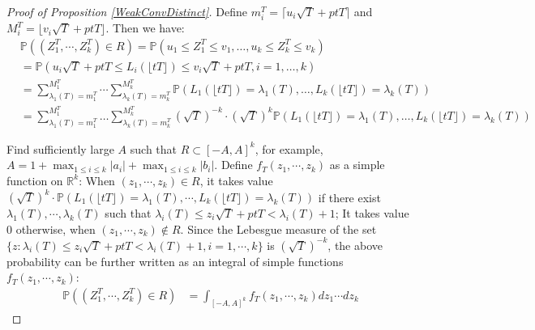 \begin{proof}[Proof of Proposition \ref{WeakConvDistinct}]
Define $m_{i}^{T}=\lceil u_{i}\sqrt{T}+ptT\rceil$ and $M_{i}^{T}=\lfloor v_{i}\sqrt{T}+ptT\rfloor$. Then we have:
\begin{align*}
&\mathbb{P}((Z_{1}^{T},\cdots,Z_{k}^{T})\in R)=\mathbb{P}(u_{1}\leqslant Z_{1}^{T} \leqslant v_{1}, \dots,  u_{k}\leqslant Z_{k}^{T} \leqslant v_{k})\\
&=\mathbb{P}(u_{i}\sqrt{T}+ptT\leqslant L_{i}(\lfloor tT\rfloor) \leqslant v_{i}\sqrt{T}+ptT, i=1,\dots, k)\\
&=\sum_{\lambda_{1}(T)=m_{1}^{T}}^{M_{1}^{T}}\cdots\sum_{\lambda_{k}(T)=m_{k}^{T}}^{M_{k}^{T}}\mathbb{P}(L_{1}(\lfloor tT \rfloor)=\lambda_{1}(T),\dots,L_{k}(\lfloor tT \rfloor)=\lambda_{k}(T))\\
&=\sum_{\lambda_{1}(T)=m_{1}^{T}}^{M_{1}^{T}}\dots\sum_{\lambda_{k}(T)=m_{k}^{T}}^{M_{k}^{T}}(\sqrt{T})^{-k}\cdot(\sqrt{T})^{k}\mathbb{P}(L_{1}(\lfloor tT \rfloor)=\lambda_{1}(T),\dots,L_{k}(\lfloor tT \rfloor)=\lambda_{k}(T))
\end{align*}

Find sufficiently large $A$ such that $R\subset[-A,A]^{k}$, for example, $A=1+\max_{1\leqslant i\leqslant k}|a_{i}|+\max_{1\leqslant i\leqslant k}|b_{i}|$. Define $f_{T}(z_{1},\cdots,z_{k})$ as a simple function on $\mathbb{R}^{k}$: When $(z_{1},\cdots,z_{k})\in R$, it takes value $(\sqrt{T})^{k}\cdot\mathbb{P}(L_{1}(\lfloor tT \rfloor)=\lambda_{1}(T),\cdots,L_{k}(\lfloor tT \rfloor)=\lambda_{k}(T)) $ if there exist $\lambda_{1}(T),\cdots,\lambda_{k}(T)$ such that $\lambda_{i}(T)\leqslant z_{i}\sqrt{T}+ptT<\lambda_{i}(T)+1$; It takes value $0$ otherwise, when $(z_{1},\cdots,z_{k})\notin R$.  Since the Lebesgue measure of the set $\{z:\lambda_{i}(T)\leqslant z_{i}\sqrt{T}+ptT<\lambda_{i}(T)+1,i=1,\cdots,k\}$ is $(\sqrt{T})^{-k}$, the above probability can be further written as an integral of simple functions $f_{T}(z_{1},\cdots,z_{k})$:
\begin{align*}
\mathbb{P}((Z_{1}^{T},\cdots,Z_{k}^{T})\in R)&=\int_{[-A,A]^{k}}f_{T}(z_{1},\cdots,z_{k})dz_{1}\cdots dz_{k}
\end{align*}


\end{proof}
